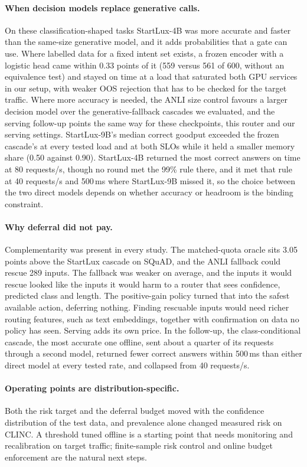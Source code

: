 \documentclass[11pt]{article}
\begin{document}
\paragraph{When decision models replace generative calls.}
On these classification-shaped tasks StartLux-4B was more accurate and faster than the same-size generative model, and it adds probabilities that a gate can use. Where labelled data for a fixed intent set exists, a frozen encoder with a logistic head came within 0.33 points of it (559 versus 561 of 600, without an equivalence test) and stayed on time at a load that saturated both GPU services in our setup, with weaker OOS rejection that has to be checked for the target traffic. Where more accuracy is needed, the ANLI size control favours a larger decision model over the generative-fallback cascades we evaluated, and the serving follow-up points the same way for these checkpoints, this router and our serving settings. StartLux-9B's median correct goodput exceeded the frozen cascade's at every tested load and at both SLOs while it held a smaller memory share (0.50 against 0.90). StartLux-4B returned the most correct answers on time at 80 requests/s, though no round met the 99\% rule there, and it met that rule at 40 requests/s and 500\,ms where StartLux-9B missed it, so the choice between the two direct models depends on whether accuracy or headroom is the binding constraint.

\paragraph{Why deferral did not pay.}
Complementarity was present in every study. The matched-quota oracle sits 3.05 points above the StartLux cascade on SQuAD, and the ANLI fallback could rescue 289 inputs. The fallback was weaker on average, and the inputs it would rescue looked like the inputs it would harm to a router that sees confidence, predicted class and length. The positive-gain policy turned that into the safest available action, deferring nothing. Finding rescuable inputs would need richer routing features, such as text embeddings, together with confirmation on data no policy has seen. Serving adds its own price. In the follow-up, the class-conditional cascade, the most accurate one offline, sent about a quarter of its requests through a second model, returned fewer correct answers within 500\,ms than either direct model at every tested rate, and collapsed from 40 requests/s.

\paragraph{Operating points are distribution-specific.}
Both the risk target and the deferral budget moved with the confidence distribution of the test data, and prevalence alone changed measured risk on CLINC. A threshold tuned offline is a starting point that needs monitoring and recalibration on target traffic; finite-sample risk control \citep{angelopoulos2021ltt} and online budget enforcement are the natural next steps.
\end{document}
